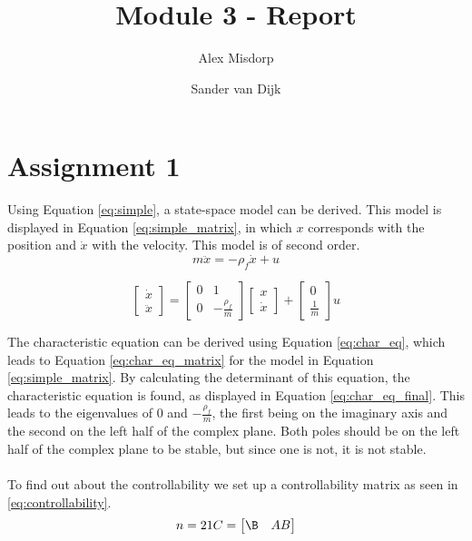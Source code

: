 \documentclass[final]{scrreprt} %
\title{Module 3 - Report}
\author{Alex {Misdorp} \and Sander {van Dijk}}
\begin{document}
\chapter{Assignment 1}
Using Equation \ref{eq:simple}, a state-space model can be derived. This model is displayed in Equation \ref{eq:simple_matrix}, in which $x$ corresponds with the position and $\dot{x}$ with the velocity. This model is of second order.
\begin{equation}
	m \ddot{x} = -\rho_f \dot{x} + u
	\label{eq:simple}
\end{equation}

\begin{equation}
	\begin{bmatrix}
		\dot{x} \\
		\ddot{x}
	\end{bmatrix} =
	\begin{bmatrix}
		0 & 1 \\
		0 & -\frac{\rho_f}{m}
	\end{bmatrix}
	\begin{bmatrix}
		x \\
		\dot{x}
	\end{bmatrix} +
	\begin{bmatrix}
		0 \\
		\frac{1}{m}
	\end{bmatrix}
	u
	\label{eq:simple_matrix}
\end{equation}

The characteristic equation can be derived using Equation \ref{eq:char_eq}, which leads to Equation \ref{eq:char_eq_matrix} for the model in Equation \ref{eq:simple_matrix}. By calculating the determinant of this equation, the characteristic equation is found, as displayed in Equation \ref{eq:char_eq_final}. This leads to the eigenvalues of $0$ and $-\frac{\rho_f}{m}$, the first being on the imaginary axis and the second on the left half of the complex plane. Both poles should be on the left half of the complex plane to be stable, but since one is not, it is not stable.
\\ \\
To find out about the controllability we set up a controllability matrix as seen in \ref{eq:controllability}.
\begin{equation}
n = 2
\newline
\centering1
C =
\begin{bmatrix}
\B & AB
\end{bmatrix}
\end{equation}
\end{document}
